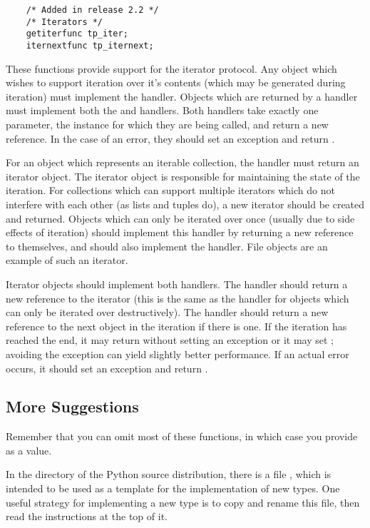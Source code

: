 \begin{verbatim}
    /* Added in release 2.2 */
    /* Iterators */
    getiterfunc tp_iter;
    iternextfunc tp_iternext;
\end{verbatim}

These functions provide support for the iterator protocol.  Any object
which wishes to support iteration over it's contents (which may be
generated during iteration) must implement the 
handler.  Objects which are returned by a  handler must
implement both the  and  handlers.
Both handlers take exactly one parameter, the instance for which they
are being called, and return a new reference.  In the case of an
error, they should set an exception and return \NULL.

For an object which represents an iterable collection, the
 handler must return an iterator object.  The iterator
object is responsible for maintaining the state of the iteration.  For
collections which can support multiple iterators which do not
interfere with each other (as lists and tuples do), a new iterator
should be created and returned.  Objects which can only be iterated
over once (usually due to side effects of iteration) should implement
this handler by returning a new reference to themselves, and should
also implement the  handler.  File objects are an
example of such an iterator.

Iterator objects should implement both handlers.  The 
handler should return a new reference to the iterator (this is the
same as the  handler for objects which can only be
iterated over destructively).  The  handler should
return a new reference to the next object in the iteration if there is
one.  If the iteration has reached the end, it may return \NULL{}
without setting an exception or it may set ;
avoiding the exception can yield slightly better performance.  If an
actual error occurs, it should set an exception and return \NULL.


\subsection{More Suggestions}

Remember that you can omit most of these functions, in which case you
provide  as a value.

In the  directory of the Python source distribution,
there is a file , which is intended to be used as a
template for the implementation of new types.  One useful strategy
for implementing a new type is to copy and rename this file, then
read the instructions at the top of it.

